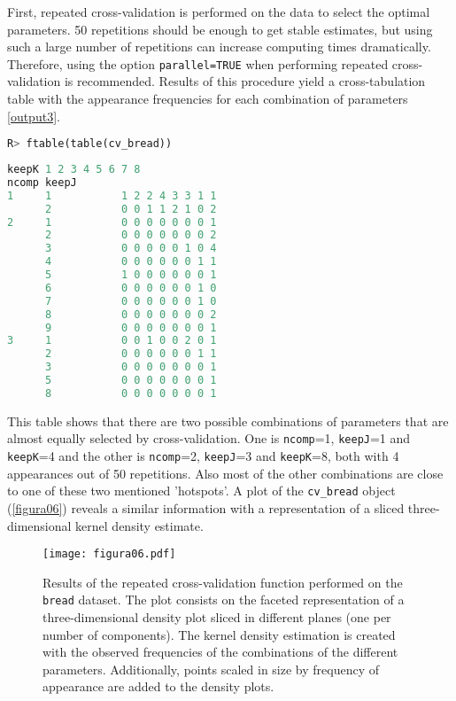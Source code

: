 First, repeated cross-validation is performed on the data to select the optimal parameters. 50 repetitions should be enough to get stable estimates, but using such a large number of repetitions can increase computing times dramatically. Therefore, using the option \texttt{parallel=TRUE} when performing repeated cross-validation is recommended. Results of this procedure yield a cross-tabulation table with the appearance frequencies for each combination of parameters \autoref{output3}.

\vspace{15pt}
\begin{lstlisting}[basicstyle=\small, language=Python]
R> ftable(table(cv_bread)) 
\end{lstlisting}

\begin{lstlisting}[basicstyle=\small, backgroundcolor=\color{output}, numbers=none, label={output3}, language=Python, caption=\texttt{repeat\_cv} results for the \texttt{bread} data set.]
            keepK 1 2 3 4 5 6 7 8
ncomp keepJ                      
1     1           1 2 2 4 3 3 1 1
      2           0 0 1 1 2 1 0 2
2     1           0 0 0 0 0 0 0 1
      2           0 0 0 0 0 0 0 2
      3           0 0 0 0 0 1 0 4
      4           0 0 0 0 0 0 1 1
      5           1 0 0 0 0 0 0 1
      6           0 0 0 0 0 0 1 0
      7           0 0 0 0 0 0 1 0
      8           0 0 0 0 0 0 0 2
      9           0 0 0 0 0 0 0 1
3     1           0 0 1 0 0 2 0 1
      2           0 0 0 0 0 0 1 1
      3           0 0 0 0 0 0 0 1
      5           0 0 0 0 0 0 0 1
      8           0 0 0 0 0 0 0 1
\end{lstlisting}    
      
This table shows that there are two possible combinations of parameters that are almost equally selected by cross-validation. One is \texttt{ncomp}=1, \texttt{keepJ}=1 and \texttt{keepK}=4 and the other is \texttt{ncomp}=2, \texttt{keepJ}=3 and \texttt{keepK}=8, both with 4 appearances out of 50 repetitions. Also most of the other combinations are close to one of these two mentioned 'hotspots'. A plot of the \texttt{cv\_bread} object (\autoref{figura06}) reveals a similar information with a representation of a sliced three-dimensional kernel density estimate.


\begin{figure}[!ht]
	\centering
\texttt{[image: figura06.pdf]}
\caption{Results of the repeated cross-validation function performed on the \texttt{bread} dataset. The plot consists on the faceted representation of a three-dimensional density plot sliced in different planes (one per number of components). The kernel density estimation is created with the observed frequencies of the combinations of the different parameters. Additionally, points scaled in size by frequency of appearance are added to the density plots.}
\label{figura06}
\end{figure}


